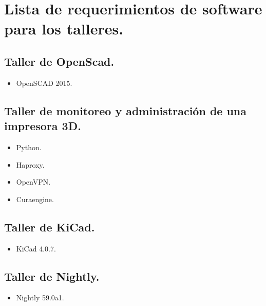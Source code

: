 \documentclass[a4paper,11pt]{article}                 %
\begin{document}
  \section*{Lista de requerimientos de software para los talleres.}
   
         \subsection*{Taller de OpenScad.}                                     %
  \label{list:openscads}
  \begin{itemize}
    \item OpenSCAD 2015.
  \end{itemize}
  
        \subsection*{Taller de monitoreo y administración de una impresora 3D.}                                     %
  \label{list:impresions}
  \begin{itemize}
    \item Python.
    \item Haproxy.
    \item OpenVPN.
    \item Curaengine.
  \end{itemize}
  
        \subsection*{Taller de KiCad.}                                     %
  \label{list:kicads}
\begin{itemize}
    \item KiCad 4.0.7.
  \end{itemize}
                \subsection*{Taller de Nightly.}                                     %
  \label{list:nightlys}
  \begin{itemize}
    \item Nightly 59.0a1.
  \end{itemize}
  \newpage
\end{document}
